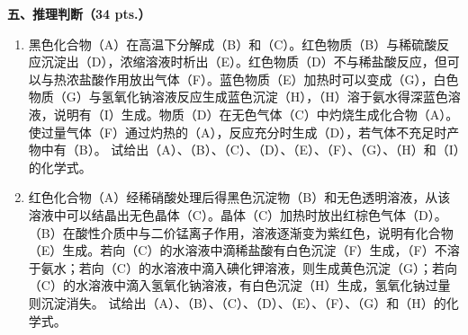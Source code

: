 \vspace{0.5cm}
\noindent\textbf{五、推理判断（34 pts.）}

\begin{enumerate}[label=\arabic*., start=1, itemsep=1.5ex]
    \item 黑色化合物（A）在高温下分解成（B）和（C）。红色物质（B）与稀硫酸反应沉淀出（D），浓缩溶液时析出（E）。红色物质（D）不与稀盐酸反应，但可以与热浓盐酸作用放出气体（F）。蓝色物质（E）加热时可以变成（G），白色物质（G）与氢氧化钠溶液反应生成蓝色沉淀（H），（H）溶于氨水得深蓝色溶液，说明有（I）生成。物质（D）在无色气体（C）中灼烧生成化合物（A）。使过量气体（F）通过灼热的（A），反应充分时生成（D），若气体不充足时产物中有（B）。
    试给出（A）、（B）、（C）、（D）、（E）、（F）、（G）、（H）和（I）的化学式。
    
    \item 红色化合物（A）经稀硝酸处理后得黑色沉淀物（B）和无色透明溶液，从该溶液中可以结晶出无色晶体（C）。晶体（C）加热时放出红棕色气体（D）。（B）在酸性介质中与二价锰离子作用，溶液逐渐变为紫红色，说明有化合物（E）生成。若向（C）的水溶液中滴稀盐酸有白色沉淀（F）生成，（F）不溶于氨水；若向（C）的水溶液中滴入碘化钾溶液，则生成黄色沉淀（G）；若向（C）的水溶液中滴入氢氧化钠溶液，有白色沉淀（H）生成，氢氧化钠过量则沉淀消失。
    试给出（A）、（B）、（C）、（D）、（E）、（F）、（G）和（H）的化学式。
\end{enumerate}